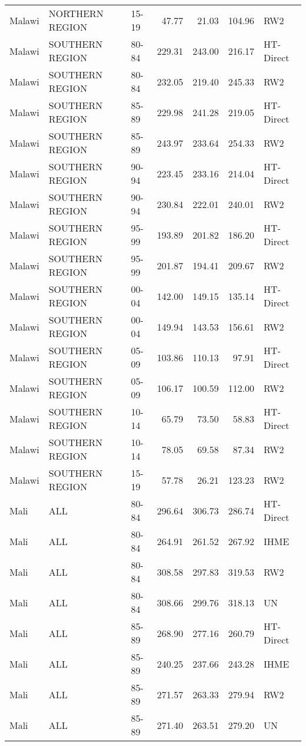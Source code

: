 \begin{longtable}{lllrrrl}
  Malawi & NORTHERN REGION & 15-19 & 47.77 & 21.03 & 104.96 & RW2 \\ 
  Malawi & SOUTHERN REGION & 80-84 & 229.31 & 243.00 & 216.17 & HT-Direct \\ 
  Malawi & SOUTHERN REGION & 80-84 & 232.05 & 219.40 & 245.33 & RW2 \\ 
  Malawi & SOUTHERN REGION & 85-89 & 229.98 & 241.28 & 219.05 & HT-Direct \\ 
  Malawi & SOUTHERN REGION & 85-89 & 243.97 & 233.64 & 254.33 & RW2 \\ 
  Malawi & SOUTHERN REGION & 90-94 & 223.45 & 233.16 & 214.04 & HT-Direct \\ 
  Malawi & SOUTHERN REGION & 90-94 & 230.84 & 222.01 & 240.01 & RW2 \\ 
  Malawi & SOUTHERN REGION & 95-99 & 193.89 & 201.82 & 186.20 & HT-Direct \\ 
  Malawi & SOUTHERN REGION & 95-99 & 201.87 & 194.41 & 209.67 & RW2 \\ 
  Malawi & SOUTHERN REGION & 00-04 & 142.00 & 149.15 & 135.14 & HT-Direct \\ 
  Malawi & SOUTHERN REGION & 00-04 & 149.94 & 143.53 & 156.61 & RW2 \\ 
  Malawi & SOUTHERN REGION & 05-09 & 103.86 & 110.13 & 97.91 & HT-Direct \\ 
  Malawi & SOUTHERN REGION & 05-09 & 106.17 & 100.59 & 112.00 & RW2 \\ 
  Malawi & SOUTHERN REGION & 10-14 & 65.79 & 73.50 & 58.83 & HT-Direct \\ 
  Malawi & SOUTHERN REGION & 10-14 & 78.05 & 69.58 & 87.34 & RW2 \\ 
  Malawi & SOUTHERN REGION & 15-19 & 57.78 & 26.21 & 123.23 & RW2 \\ 
  Mali & ALL & 80-84 & 296.64 & 306.73 & 286.74 & HT-Direct \\ 
  Mali & ALL & 80-84 & 264.91 & 261.52 & 267.92 & IHME \\ 
  Mali & ALL & 80-84 & 308.58 & 297.83 & 319.53 & RW2 \\ 
  Mali & ALL & 80-84 & 308.66 & 299.76 & 318.13 & UN \\ 
  Mali & ALL & 85-89 & 268.90 & 277.16 & 260.79 & HT-Direct \\ 
  Mali & ALL & 85-89 & 240.25 & 237.66 & 243.28 & IHME \\ 
  Mali & ALL & 85-89 & 271.57 & 263.33 & 279.94 & RW2 \\ 
  Mali & ALL & 85-89 & 271.40 & 263.51 & 279.20 & UN \\ 

\end{longtable}
